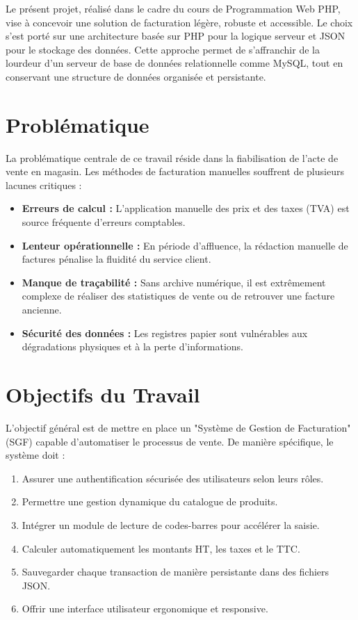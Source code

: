 \documentclass[12pt,a4paper]{report}
\begin{document}
Le présent projet, réalisé dans le cadre du cours de Programmation Web PHP, vise à concevoir une solution de facturation légère, robuste et accessible. Le choix s'est porté sur une architecture basée sur PHP pour la logique serveur et JSON pour le stockage des données. Cette approche permet de s'affranchir de la lourdeur d'un serveur de base de données relationnelle comme MySQL, tout en conservant une structure de données organisée et persistante.

\section{Problématique}
La problématique centrale de ce travail réside dans la fiabilisation de l'acte de vente en magasin. Les méthodes de facturation manuelles souffrent de plusieurs lacunes critiques :
\begin{itemize}
    \item \textbf{Erreurs de calcul :} L'application manuelle des prix et des taxes (TVA) est source fréquente d'erreurs comptables.
    \item \textbf{Lenteur opérationnelle :} En période d'affluence, la rédaction manuelle de factures pénalise la fluidité du service client.
    \item \textbf{Manque de traçabilité :} Sans archive numérique, il est extrêmement complexe de réaliser des statistiques de vente ou de retrouver une facture ancienne.
    \item \textbf{Sécurité des données :} Les registres papier sont vulnérables aux dégradations physiques et à la perte d'informations.
\end{itemize}

\section{Objectifs du Travail}
L'objectif général est de mettre en place un "Système de Gestion de Facturation" (SGF) capable d'automatiser le processus de vente. De manière spécifique, le système doit :
\begin{enumerate}
    \item Assurer une authentification sécurisée des utilisateurs selon leurs rôles.
    \item Permettre une gestion dynamique du catalogue de produits.
    \item Intégrer un module de lecture de codes-barres pour accélérer la saisie.
    \item Calculer automatiquement les montants HT, les taxes et le TTC.
    \item Sauvegarder chaque transaction de manière persistante dans des fichiers JSON.
    \item Offrir une interface utilisateur ergonomique et responsive.
\end{enumerate}
\end{document}

